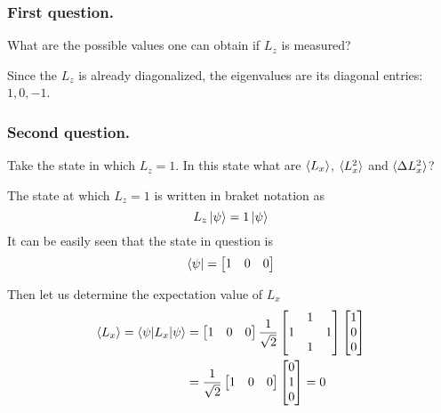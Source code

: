 \documentclass[../../../main.tex]{subfiles}
\begin{document}
\subsubsection{First question.}
What are the possible values one can obtain if $L_z$ is measured?

Since the $L_z$ is already diagonalized, the eigenvalues are its diagonal entries: $1,0,-1$.

\subsubsection{Second question.}
Take the state in which $L_z=1$. 
In this state what are $\braket{L_x}$, $\braket{L_x^2}$ and $\braket{\Delta L_x^2}$?

The state at which $L_z=1$ is written in braket notation as 
\begin{equation*}
    L_z \ket{\psi}=1 \ket{\psi}
\end{equation*}
It can be easily seen that the state in question is 
\begin{equation*}
    \bra{\psi}=\begin{bmatrix}
        1&0&0
    \end{bmatrix}
\end{equation*}

Then let us determine the expectation value of $L_x$
\begin{align*}
    \braket{L_x}=\braket{\psi|L_x|\psi}&= 
    \begin{bmatrix}
        1&0&0
    \end{bmatrix}
    \frac{1 }{\sqrt{2 }}\begin{bmatrix}
        &1&\\
        1&&1\\
        &1&\\
    \end{bmatrix}
    \begin{bmatrix}
        1\\
        0\\
        0\\
    \end{bmatrix}\\
    &= 
    \frac{1 }{\sqrt{2}}
    \begin{bmatrix}
        1&0&0
    \end{bmatrix}
    \begin{bmatrix}
        0\\
        1\\
        0\\
    \end{bmatrix}
    =
    0
\end{align*}
\end{document}
